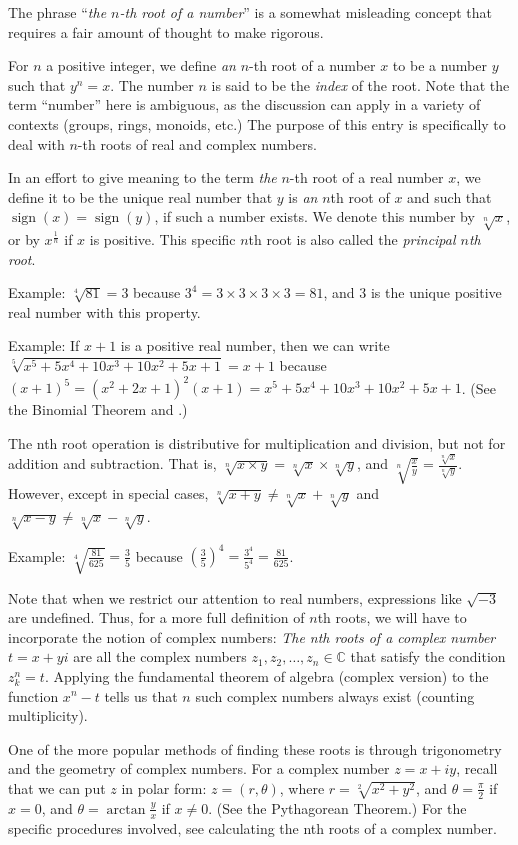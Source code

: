 \documentclass{article}
\begin{document}

The phrase ``\emph{the $n$-th root of a number}'' is a somewhat misleading concept that requires a fair amount of thought to make rigorous.

For $n$ a positive integer, we define \emph{an} $n$-th root of a number $x$ to be a number $y$ such that $y^n=x$.  The number $n$ is said to be the \emph{index} of the root.  Note that the term ``number'' here is ambiguous, as the discussion can apply in a variety of contexts (groups, rings, monoids, etc.)  The purpose of this entry is specifically to deal with $n$-th roots of real and complex numbers.

In an effort to give meaning to the term \emph{the} $n$-th root of a real number $x$, we define it to be the unique real number that $y$ is \emph{an} $n$th root of $x$ and such that $\operatorname{sign}(x)=\operatorname{sign}(y)$, if such a number exists.  We denote this number by $\sqrt[n]{x}$, or by $x^{\frac{1}{n}}$ if $x$ is positive.  This specific $n$th root is also called the \emph{principal $n$th root}.

Example:  $\sqrt[4]{81} = 3$ because $3^4 = 3 \times 3 \times 3 \times 3= 81$, and $3$ is the unique positive real number with this property.

Example:  If $x+1$ is a positive real number, then we can write $\sqrt[5]{x^5 + 5x^4 + 10x^3 + 10x^2 + 5x + 1} = x + 1$ because
$(x + 1)^5 = (x^2 + 2x + 1)^2(x + 1) = x^5 + 5x^4 + 10x^3 + 10x^2 + 5x + 1$.  (See the Binomial Theorem
and .)

The nth root operation is distributive for multiplication and division, but not for addition and
subtraction.  That is, $\sqrt[n]{x \times y} = \sqrt[n]{x} \times \sqrt[n]{y}$, and
$\sqrt[n]{\frac{x}{y}} = \frac{\sqrt[n]{x}}{\sqrt[n]{y}}$.  However, except in special cases,
$\sqrt[n]{x + y} \not= \sqrt[n]{x} + \sqrt[n]{y}$ and $\sqrt[n]{x - y} \not= \sqrt[n]{x} - \sqrt[n]{y}$.

Example:  $\sqrt[4]{\frac{81}{625}} = \frac{3}{5}$ because
$\left(\frac{3}{5}\right)^4 = \frac{3^4}{5^4} = \frac{81}{625}$.

Note that when we restrict our attention to real numbers, expressions like $\sqrt{-3}$ are undefined.  Thus, for a more full definition of $n$th roots, we will have to incorporate the notion of complex numbers:  \emph{The nth roots of a complex number} $t = x + yi$ are all the complex numbers $z_1, z_2, \ldots, z_n \in \mathbb{C}$ that satisfy the condition $z_k^n = t$.  Applying the fundamental theorem of algebra (complex version) to the function $x^n-t$ tells us that $n$ such complex numbers always exist (counting multiplicity).

One of the more popular methods of finding these roots is through trigonometry and the geometry of complex numbers.  For a complex number $z=x+iy$, recall that we can put $z$ in polar form:  $z=(r, \theta)$, where $r = \sqrt[2]{x^2 + y^2}$, and $\theta = \frac{\pi}{2}$ if $x = 0$, and $\theta = \arctan{\frac{y}{x}}$ if $x \not= 0$.  (See the Pythagorean Theorem.)  For the specific procedures involved, see calculating the nth roots of a complex number.
\end{document}
